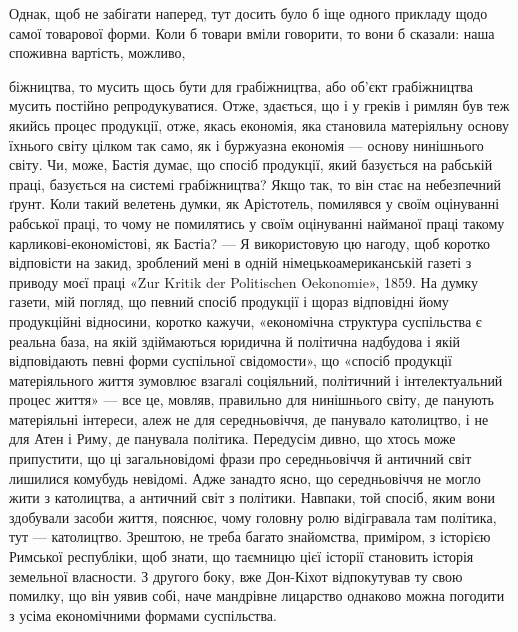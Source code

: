Однак, щоб не забігати наперед, тут досить було б іще одного
прикладу щодо самої товарової форми. Коли б товари вміли говорити,
то вони б сказали: наша споживна вартість, можливо,

біжництва, то мусить щось бути для грабіжництва, або об’єкт грабіжництва
мусить постійно репродукуватися. Отже, здається, що і у греків і
римлян був теж якийсь процес продукції, отже, якась економія, яка
становила матеріяльну основу їхнього світу цілком так само, як і буржуазна
економія — основу нинішнього світу. Чи, може, Бастія думає,
що спосіб продукції, який базується на рабській праці, базується на системі
грабіжництва? Якщо так, то він стає на небезпечний ґрунт. Коли
такий велетень думки, як Арістотель, помилявся у своїм оцінуванні рабської
праці, то чому не помилятись у своїм оцінуванні найманої праці
такому карликові-економістові, як Бастіа? — Я використовую цю нагоду,
щоб коротко відповісти на закид, зроблений мені в одній німецькоамериканській
газеті з приводу моєї праці «Zur Kritik der Politischen
Oekonomie», 1859. На думку газети, мій погляд, що певний спосіб продукції
і щораз відповідні йому продукційні відносини, коротко кажучи,
«економічна структура суспільства є реальна база, на якій здіймаються
юридична й політична надбудова і якій відповідають певні форми
суспільної свідомости», що «спосіб продукції матеріяльного життя зумовлює
взагалі соціяльний, політичний і інтелектуальний процес життя» —
все це, мовляв, правильно для нинішнього світу, де панують матеріяльні
інтереси, алеж не для середньовіччя, де панувало католицтво, і не для
Атен і Риму, де панувала політика. Передусім дивно, що хтось може
припустити, що ці загальновідомі фрази про середньовіччя й античний
світ лишилися комубудь невідомі. Адже занадто ясно, що середньовіччя
не могло жити з католицтва, а античний світ з політики. Навпаки, той
спосіб, яким вони здобували засоби життя, пояснює, чому головну ролю
відігравала там політика, тут — католицтво. Зрештою, не треба багато
знайомства, приміром, з історією Римської республіки, щоб знати, що
таємницю цієї історії становить історія земельної власности. З другого
боку, вже Дон-Кіхот відпокутував ту свою помилку, що він уявив собі,
наче мандрівне лицарство однаково можна погодити з усіма економічними
формами суспільства.
\parbreak{}  %
